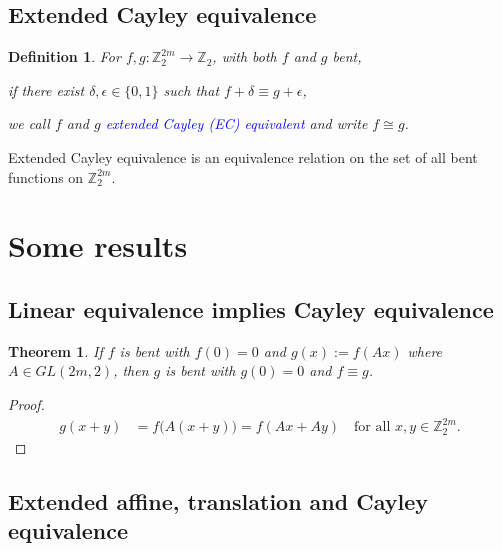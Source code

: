\documentclass[12pt,a4paper]{article}
\newcommand{\mb}[1]{\mathbb{#1}}
\newcommand{\Z}{\mb{Z}}
\newcommand{\To}{\rightarrow}
\newcommand{\Emph}[1]{\emph{\textcolor{blue}{#1}}}
\newtheorem{Theorem}{Theorem}
\newtheorem{Definition}{Definition}
\begin{document}
\subsection*{Extended Cayley equivalence}
\begin{Definition}
For $f, g : \Z_2^{2m} \To \Z_2$, with both $f$ and $g$ bent,

if there exist $\delta, \epsilon \in \{0,1\}$ such that $f + \delta \equiv g + \epsilon$, 

we call $f$ and $g$ \Emph{extended Cayley (EC) equivalent} and write $f \cong g$. 
\end{Definition}
Extended Cayley equivalence is an equivalence relation on the set of all bent functions on $\Z_2^{2m}$.
\section{Some results}

\subsection*{Linear equivalence implies Cayley equivalence}

\begin{Theorem}
\label{th-Linear-Cayley}
If $f$ is bent with $f(0)=0$ and $g(x) := f(A x)$ where $A \in GL(2m,2)$,
then $g$ is bent with $g(0)=0$ and $f \equiv g$.
\end{Theorem}
\begin{proof}
\begin{align*}
g(x+y) &= f\big(A(x+y)\big) = f(A x + A y)\quad \text{for all~} x,y \in \Z_2^{2m}. 
\end{align*}
\end{proof}
 

\subsection*{Extended affine, translation and Cayley equivalence}
\end{document}
